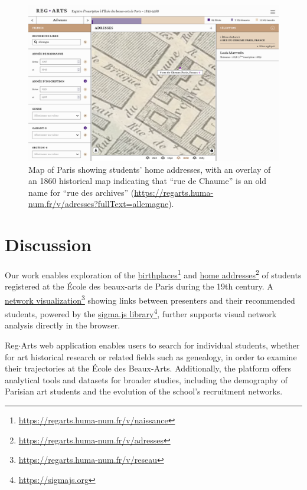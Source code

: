 \documentclass[final]{anthology-ch} %
\begin{document}
\begin{figure}[t!]
  \centering
  \includegraphics[width=1\linewidth]{figures/paris_map_chaume.png}
  \caption{Map of Paris showing students’ home addresses, with an overlay of an 1860 historical map indicating that “rue de Chaume” is an old name for “rue des archives” (\href{https://regarts.huma-num.fr/v/adresses?fullText=allemagne}{https://regarts.huma-num.fr/v/adresses?fullText=allemagne}).}
  \label{fig:home_map}
\end{figure}

\section{Discussion}
Our work enables exploration of the \href{https://regarts.huma-num.fr/v/naissance}{birthplaces}\footnote{\url{https://regarts.huma-num.fr/v/naissance}} and \href{https://regarts.huma-num.fr/v/adresses}{home addresses}\footnote{\url{https://regarts.huma-num.fr/v/adresses}} of students registered at the École des beaux-arts de Paris during the 19th century. A \href{https://regarts.huma-num.fr/v/reseau}{network visualization}\footnote{\url{https://regarts.huma-num.fr/v/reseau}} showing links between presenters and their recommended students, powered by the \href{https://sigmajs.org}{sigma.js library}\footnote{\url{https://sigmajs.org}}, further supports visual network analysis directly in the browser. 

Reg$\cdot$Arts web application enables users to search for individual students, whether for art historical research or related fields such as genealogy, in order to examine their trajectories at the École des Beaux-Arts. Additionally, the platform offers analytical tools and datasets for broader studies, including the demography of Parisian art students and the evolution of the school’s recruitment networks. 
\end{document}
